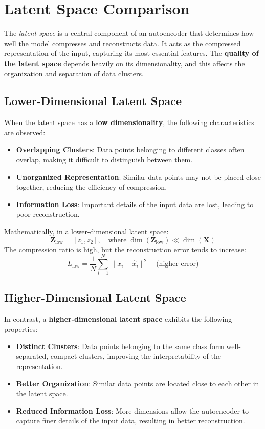 \documentclass[a4paper,12pt]{article}
\begin{document}
\section{Latent Space Comparison}
The \textit{latent space} is a central component of an autoencoder that determines how well the model compresses and reconstructs data. It acts as the compressed representation of the input, capturing its most essential features. The \textbf{quality of the latent space} depends heavily on its dimensionality, and this affects the organization and separation of data clusters.

\subsection{Lower-Dimensional Latent Space}
When the latent space has a \textbf{low dimensionality}, the following characteristics are observed:
\begin{itemize}
    \item \textbf{Overlapping Clusters}: Data points belonging to different classes often overlap, making it difficult to distinguish between them.
    \item \textbf{Unorganized Representation}: Similar data points may not be placed close together, reducing the efficiency of compression.
    \item \textbf{Information Loss}: Important details of the input data are lost, leading to poor reconstruction.
\end{itemize}

Mathematically, in a lower-dimensional latent space:
\[
\mathbf{Z}_{\text{low}} = [z_1, z_2], \quad \text{where} \; \dim(\mathbf{Z}_{\text{low}}) \ll \dim(\mathbf{X})
\]
The compression ratio is high, but the reconstruction error tends to increase:
\[
L_{\text{low}} = \frac{1}{N} \sum_{i=1}^{N} \|x_i - \hat{x}_i\|^2 \quad \text{(higher error)}
\]

\subsection{Higher-Dimensional Latent Space}
In contrast, a \textbf{higher-dimensional latent space} exhibits the following properties:
\begin{itemize}
    \item \textbf{Distinct Clusters}: Data points belonging to the same class form well-separated, compact clusters, improving the interpretability of the representation.
    \item \textbf{Better Organization}: Similar data points are located close to each other in the latent space.
    \item \textbf{Reduced Information Loss}: More dimensions allow the autoencoder to capture finer details of the input data, resulting in better reconstruction.
\end{itemize}
\end{document}
